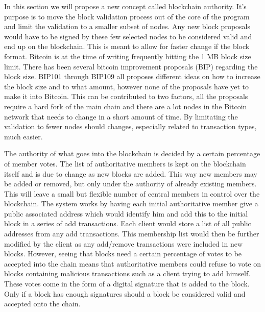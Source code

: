\documentclass[12pt]{article}
\begin{document}
In this section we will propose a new concept called blockchain authority. It's purpose is to move the block validation process out of the core of the program and limit the validation to a smaller subset of nodes. Any new block proposals would have to be signed by these few selected nodes to be considered valid and end up on the blockchain. This is meant to allow for faster change if the block format. Bitcoin is at the time of writing frequently hitting the 1 MB block size limit. There has been several bitcoin improvement proposals (BIP) regarding the block size. BIP101 through BIP109\cite{bips} all proposes different ideas on how to increase the block size and to what amount, however none of the proposals have yet to make it into Bitcoin. This can be contributed to two factors, all the proposals require a hard fork of the main chain and there are a lot nodes in the Bitcoin network that needs to change in a short amount of time. By limitating the validation to fewer nodes should changes, especially related to transaction types, much easier.

The authority of what goes into the blockchain is decided by a certain percentage of member votes. The list of authoritative members is kept on the blockchain itself and is due to change as new blocks are added. This way new members may be added or removed, but only under the authority of already existing members. This will leave a small but flexible number of central members in control over the blockchain. The system works by having each initial authoritative member give a public associated address which would identify him and add this to the initial block in a series of add transactions. Each client would store a list of all public addresses from any add transactions. This membership list would then be further modified by the client as any add/remove transactions were included in new blocks. However, seeing that blocks need a certain percentage of votes to be accepted into the chain means that authoritative members could refuse to vote on blocks containing malicious transactions such as a client trying to add himself. These votes come in the form of a digital signature that is added to the block. Only if a block has enough signatures should a block be considered valid and accepted onto the chain. 

\end{document}
